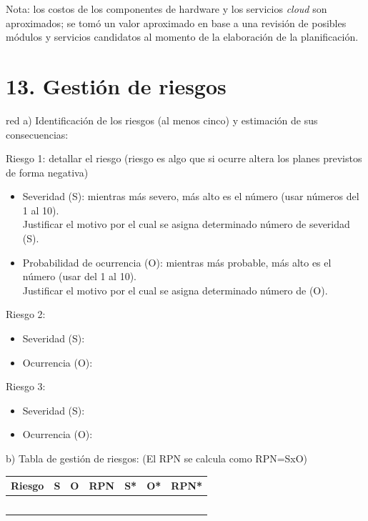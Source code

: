 \documentclass[
11pt, %
]{charter}
\begin{document}
Nota: los costos de los componentes de hardware y los servicios \textit{cloud} son aproximados; se tomó un valor aproximado en base a una revisión de posibles módulos y servicios candidatos al momento de la elaboración de la planificación.

\section{13. Gestión de riesgos}
\label{sec:riesgos}

\begin{consigna}{red}
a) Identificación de los riesgos (al menos cinco) y estimación de sus consecuencias:
 
Riesgo 1: detallar el riesgo (riesgo es algo que si ocurre altera los planes previstos de forma negativa)
\begin{itemize}
	\item Severidad (S): mientras más severo, más alto es el número (usar números del 1 al 10).\\
	Justificar el motivo por el cual se asigna determinado número de severidad (S).
	\item Probabilidad de ocurrencia (O): mientras más probable, más alto es el número (usar del 1 al 10).\\
	Justificar el motivo por el cual se asigna determinado número de (O). 
\end{itemize}   

Riesgo 2:
\begin{itemize}
	\item Severidad (S): 
	\item Ocurrencia (O):
\end{itemize}

Riesgo 3:
\begin{itemize}
	\item Severidad (S): 
	\item Ocurrencia (O):
\end{itemize}


b) Tabla de gestión de riesgos:      (El RPN se calcula como RPN=SxO)

\begin{table}[htpb]
\centering
\begin{tabularx}{\linewidth}{@{}|X|c|c|c|c|c|c|@{}}
\hline
\rowcolor[HTML]{C0C0C0} 
Riesgo & S & O & RPN & S* & O* & RPN* \\ \hline
       &   &   &     &    &    &      \\ \hline
       &   &   &     &    &    &      \\ \hline
       &   &   &     &    &    &      \\ \hline
       &   &   &     &    &    &      \\ \hline
       &   &   &     &    &    &      \\ \hline
\end{tabularx}%
\end{table}


\end{consigna}
\end{document}
